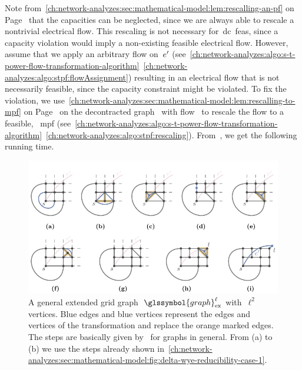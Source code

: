 % 
Note from~\cref{ch:network-analyzes:sec:mathematical-model:lem:rescalling-an-pf}
on 
Page~\pageref{ch:network-analyzes:sec:mathematical-model:lem:rescalling-an-pf}
that the capacities can be neglected, since we are always able to rescale a 
nontrivial electrical flow. This rescaling is not necessary
for~\gls{dc}~\gls{feas}, since a capacity violation would imply a non-existing
feasible electrical flow. However, assume that we apply an arbitrary flow
on~$e'$
(see~\cref{ch:network-analyzes:algo:s-t-power-flow-transformation-algorithm}~\cref{ch:network-analyzes:algo:stpf:flowAssignment})
resulting in an electrical flow that is not necessarily feasible, since the
capacity constraint might be violated. To fix the violation, we
use~\cref{ch:network-analyzes:sec:mathematical-model:lem:rescalling-to-mpf} on
Page~\pageref{ch:network-analyzes:sec:mathematical-model:lem:rescalling-to-mpf}
on the decontracted graph~ with flow~ to
rescale the flow to a feasible, \eg~\gls{mpf} 
(see~\cref{ch:network-analyzes:algo:s-t-power-flow-transformation-algorithm}~\cref{ch:network-analyzes:algo:stpf:rescaling}).
From~\textcite{Tru89}, we get the following running time.
% 
\begin{figure}[t!]
    \includegraphics{networkAnalyzes/figures/Delta-Wye-Reducibility-Case-2.pdf}
    \caption[The delta-wye-reducibility of a general extended grid graph.]{A
    general extended grid graph~$\glssymbol{graph}_{\mathrm{ex}}^\ell$
    with~$\ell^2$ vertices. Blue edges and blue vertices represent the edges and
    vertices of the transformation and replace the orange marked edges. The
    steps are basically given by~\textcite{Tru89} for graphs in general. From
    (a) to (b) we use the steps already shown
    in~\cref{ch:network-analyzes:sec:mathematical-model:fig:delta-wye-reducibility-case-1}.
    }    %
    \label{ch:network-analyzes:sec:mathematical-model:fig:delta-wye-reducibility-case-2}
\end{figure}

